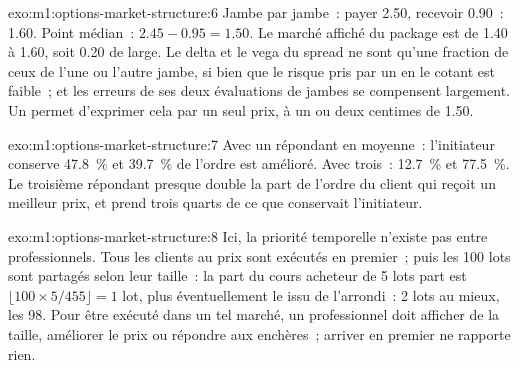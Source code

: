 \begin{solution}{exo:m1:options-market-structure:6}
Jambe par jambe~: payer 2.50, recevoir 0.90~: 1.60. Point médian~: $2.45 - 0.95 = 1.50$. Le
marché affiché du package est de 1.40 à 1.60, soit 0.20 de large. Le delta et
le vega du spread ne sont qu'une fraction de ceux de l'une ou l'autre jambe, si bien que
le risque pris par un  en le cotant est faible~; et les erreurs de ses deux évaluations de jambes se compensent largement. Un  permet d'exprimer cela par un seul prix, à un ou deux centimes de 1.50.
\end{solution}

\begin{solution}{exo:m1:options-market-structure:7}
Avec un répondant en moyenne~: l'initiateur conserve 47.8~\% et 39.7~\% de l'ordre
est amélioré. Avec trois~: 12.7~\% et 77.5~\%. Le troisième répondant presque double la
part de l'ordre du client qui reçoit un meilleur prix, et prend trois quarts de ce que
conservait l'initiateur.
\end{solution}

\begin{solution}{exo:m1:options-market-structure:8}
Ici, la priorité temporelle n'existe pas entre professionnels. Tous les clients au
prix sont exécutés en premier~; puis les 100 lots sont partagés selon leur taille~: la part du cours acheteur de 5 lots
part est $\lfloor 100 \times 5/455\rfloor = 1$ lot, plus éventuellement le 
issu de l'arrondi~: 2 lots au mieux, les  98. Pour être exécuté dans un tel
marché, un professionnel doit afficher de la taille, améliorer le prix ou répondre aux
enchères~; arriver en premier ne rapporte rien.
\end{solution}

